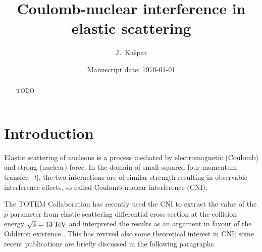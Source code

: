 \documentclass[pdftex,twocolumn,epjc3]{svjour3}
\def\un#1{\,{\rm #1}}
\begin{document}
\title{Coulomb-nuclear interference in elastic scattering}


\author{
	J.~Ka\v spar
}



\date{Manuscript date: \today}

\maketitle

\begin{abstract}
TODO
\end{abstract}




\section{Introduction}
\label{sec:introduction}

Elastic scattering of nucleons is a process mediated by electromagnetic (Coulomb) and strong (nuclear) force. In the domain of small squared four-momentum transfer, $|t|$, the two interactions are of similar strength resulting in observable interference effects, so called Coulomb-nuclear interference (CNI).

The TOTEM Collaboration has recently used the CNI to extract the value of the $\rho$ parameter from elastic scattering differential cross-section at the collision energy $\sqrt s = 13\un{TeV}$ and interpreted the results as an argument in favour of the Odderon existence \cite{totem-13tev-rho}. This has revived also some theoretical interest in CNI; some recent publications are briefly discussed in the following paragraphs.
\end{document}
